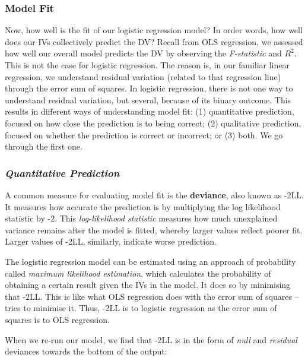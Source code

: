 \documentclass[
]{book}
\begin{document}
\hypertarget{model-fit}{%
\subsubsection{\texorpdfstring{\textbf{Model Fit}}{Model Fit}}\label{model-fit}}

Now, how well is the fit of our logistic regression model? In order words, how well does our IVs collectively predict the DV? Recall from OLS regression, we assessed how well our overall model predicts the DV by observing the \emph{F-statistic} and \emph{\(R^2\)}. This is not the case for logistic regression. The reason is, in our familiar linear regression, we understand residual variation (related to that regression line) through the error sum of squares. In logistic regression, there is not one way to understand residual variation, but several, because of its binary outcome. This results in different ways of understanding model fit: (1) quantitative prediction, focused on how close the prediction is to being correct; (2) qualitative prediction, focused on whether the prediction is correct or incorrect; or (3) both. We go through the first one.

\hypertarget{quantitative-prediction}{%
\subsubsection{\texorpdfstring{\emph{Quantitative Prediction}}{Quantitative Prediction}}\label{quantitative-prediction}}

A common measure for evaluating model fit is the \textbf{deviance}, also known as -2LL. It measures how accurate the prediction is by multiplying the log likelihood statistic by -2. This \emph{log-likelihood statistic} measures how much unexplained variance remains after the model is fitted, whereby larger values reflect poorer fit. Larger values of -2LL, similarly, indicate worse prediction.

The logistic regression model can be estimated using an approach of probability called \emph{maximum likelihood estimation}, which calculates the probability of obtaining a certain result given the IVs in the model. It does so by minimising that -2LL. This is like what OLS regression does with the error sum of squares -- tries to minimise it. Thus, -2LL is to logistic regression as the error sum of squares is to OLS regression.

When we re-run our model, we find that -2LL is in the form of \emph{null} and \emph{residual} deviances towards the bottom of the output:
\end{document}
